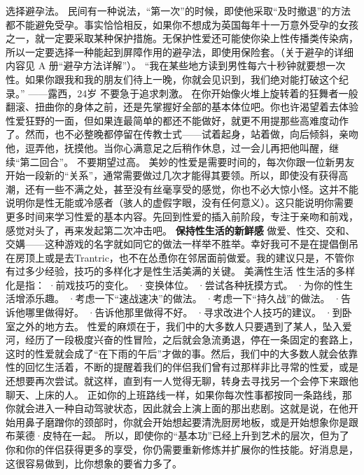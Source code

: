 \documentclass[12pt,UTF8,openany]{ctexbook}
\begin{document}
选择避孕法。
民间有一种说法，“第一次”的时候，即使他采取“及时撤退”的方法都不能避免受孕。事实恰恰相反，如果你不想成为英国每年十一万意外受孕的女孩之一，就一定要采取某种保护措施。无保护性爱还可能使你染上性传播类传染病，所以一定要选择一种能起到屏障作用的避孕法，即使用保险套。（关于避孕的详细内容见 A 册“避孕方法详解”）。
“我在某些地方读到男性每六十秒钟就要想一次性。如果你跟我和我的朋友们待上一晚，你就会见识到，我们绝对能打破这个纪录。”
——露西，24岁
不要急于追求刺激。
在你开始像火堆上旋转着的狂舞者一般翻滚、扭曲你的身体之前，还是先掌握好全部的基本体位吧。你也许渴望着去体验性爱狂野的一面，但如果连最简单的都还不能做好，就更不用提那些高难度动作了。然而，也不必整晚都停留在传教士式——试着起身，站着做，向后倾斜，亲吻他，逗弄他，抚摸他。当你心满意足之后稍作休息，过一会儿再把他叫醒，继续“第二回合”。
不要期望过高。
美妙的性爱是需要时间的，每次你跟一位新男友开始一段新的“关系”，通常需要做过几次才能得其要领。所以，即使没有获得高潮，还有一些不满之处，甚至没有丝毫享受的感觉，你也不必大惊小怪。这并不能说明你是性无能或冷感者（骇人的虚假字眼，没有任何意义）。这只能说明你需要更多时间来学习性爱的基本内容。先回到性爱的插入前阶段，专注于亲吻和前戏，感觉对头了，再来发起第二次冲击吧。
\textbf{保持性生活的新鲜感}
做爱、性交、交和、交媾——这种游戏的名字就如同它的做法一样举不胜举。幸好我可不是在提倡倒吊在房顶上或是去Trantric，也不在怂恿你在邻居面前做爱。我的建议只是，不管你有过多少经验，技巧的多样化才是性生活美满的关键。
美满性生活
性生活的多样化是指：
·前戏技巧的变化。
·变换体位。
·尝试各种抚摸方式。
·为你的性生活增添乐趣。
·考虑一下“速战速决”的做法。
·考虑一下“持久战”的做法。
·告诉他哪里做得好。
·告诉他那里做得不好。
·寻求改进个人技巧的建议。
·到卧室之外的地方去。
性爱的麻烦在于，我们中的大多数人只要遇到了某人，坠入爱河，经历了一段极度兴奋的性冒险，之后就会急流勇退，停在一条固定的套路上，这时的性爱就会成了“在下雨的午后”才做的事。然后，我们中的大多数人就会依靠性的回忆生活着，不断的提醒着我们的伴侣我们曾有过那样非比寻常的性爱，或是还想要再次尝试。就这样，直到有一人觉得无聊，转身去寻找另一个会停下来跟他聊天、上床的人。
正如你的上班路线一样，如果你每次性事都按同一条路线，那你就会进入一种自动驾驶状态，因此就会上演上面的那出悲剧。这就是说，在他开始用鼻子磨蹭你的颈部时，你就会开始想起要清洗厨房地板，或是开始想象你是跟布莱德·皮特在一起。
所以，即使你的“基本功”已经上升到艺术的层次，但为了你和你的伴侣获得更多的享受，你仍需要重新修炼并扩展你的性技能。好消息是，这很容易做到，比你想象的要省力多了。
\end{document}
